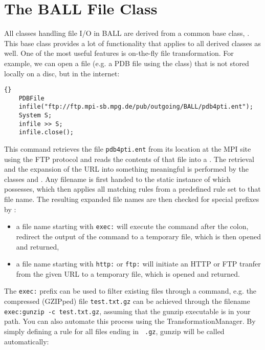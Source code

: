 \section{The BALL File Class}

All classes handling file I/O in BALL are derived from a common
base class, . This base class provides a lot of
functionality that applies to all derived classes as well.
One of the most useful features is on-the-fly file transformation.
For example, we can open a file (e.g. a PDB file using the  
class) that is not stored locally on a disc, but in the internet:

\begin{lstlisting}{}
	PDBFile
	infile("ftp://ftp.mpi-sb.mpg.de/pub/outgoing/BALL/pdb4pti.ent");
	System S;
	infile >> S;
	infile.close();
\end{lstlisting}

\noindent
This command retrieves the file {\tt pdb4pti.ent} from its location at the MPI
site using the FTP protocol and reads the contents of that file into a
. The retrieval and the expansion of the URL into something
meaningful is performed by the classes  and
. Any filename is first handed to the static instance of
 which  possesses, which then applies
all matching rules from a predefined rule set to that file name. The resulting
expanded file names are then checked for special prefixes by :
\begin{itemize}
  \item a file name starting with {\tt exec:} will execute the command after the
        colon, redirect the output of the command to a temporary file, which 	
        is then opened and returned,

  \item a file name starting with {\tt http:} or {\tt ftp:} will initiate
        an HTTP or FTP tranfer from the given URL to a temporary file, which
        is opened and returned.
\end{itemize}

\noindent 
The {\tt exec:} prefix can be used to filter existing files through a command, 
e.g. the compressed (GZIPped) file {\tt test.txt.gz} can be achieved through
the filename {\tt exec:gunzip -c test.txt.gz}, assuming that the gunzip
executable is in your path. You can also automate this process using the
TransformationManager. By simply defining a rule for all files ending in {\tt
.gz}, gunzip will be called automatically:

